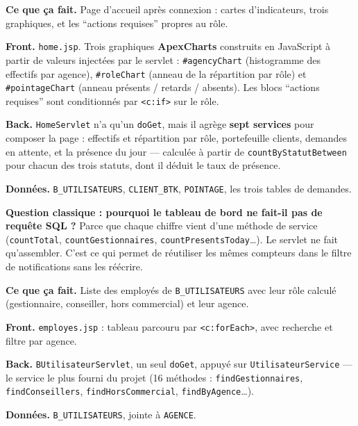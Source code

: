 \textbf{Ce que ça fait.} Page d'accueil après connexion : cartes d'indicateurs,
trois graphiques, et les \enquote{actions requises} propres au rôle.

\textbf{Front.} \texttt{home.jsp}. Trois graphiques \textbf{ApexCharts}
construits en JavaScript à partir de valeurs injectées par le servlet :
\texttt{\#agencyChart} (histogramme des effectifs par agence),
\texttt{\#roleChart} (anneau de la répartition par rôle) et
\texttt{\#pointageChart} (anneau présents / retards / absents). Les blocs
\enquote{actions requises} sont conditionnés par \texttt{<c:if>} sur le rôle.

\textbf{Back.} \texttt{HomeServlet} n'a qu'un \texttt{doGet}, mais il agrège
\textbf{sept services} pour composer la page : effectifs et répartition par
rôle, portefeuille clients, demandes en attente, et la présence du jour ---
calculée à partir de \texttt{countByStatutBetween} pour chacun des trois
statuts, dont il déduit le taux de présence.

\textbf{Données.} \texttt{B\_UTILISATEURS}, \texttt{CLIENT\_BTK},
\texttt{POINTAGE}, les trois tables de demandes.

\begin{retenir}
\textbf{Question classique : pourquoi le tableau de bord ne fait-il pas de
requête SQL ?} Parce que chaque chiffre vient d'une méthode de service
(\texttt{countTotal}, \texttt{countGestionnaires}, \texttt{countPresentsToday}\dots).
Le servlet ne fait qu'assembler. C'est ce qui permet de réutiliser les mêmes
compteurs dans le filtre de notifications sans les réécrire.
\end{retenir}


\textbf{Ce que ça fait.} Liste des employés de \texttt{B\_UTILISATEURS} avec
leur rôle calculé (gestionnaire, conseiller, hors commercial) et leur agence.

\textbf{Front.} \texttt{employes.jsp} : tableau parcouru par
\texttt{<c:forEach>}, avec recherche et filtre par agence.

\textbf{Back.} \texttt{BUtilisateurServlet}, un seul \texttt{doGet}, appuyé sur
\texttt{UtilisateurService} --- le service le plus fourni du projet
(16 méthodes : \texttt{findGestionnaires}, \texttt{findConseillers},
\texttt{findHorsCommercial}, \texttt{findByAgence}\dots).

\textbf{Données.} \texttt{B\_UTILISATEURS}, jointe à \texttt{AGENCE}.

